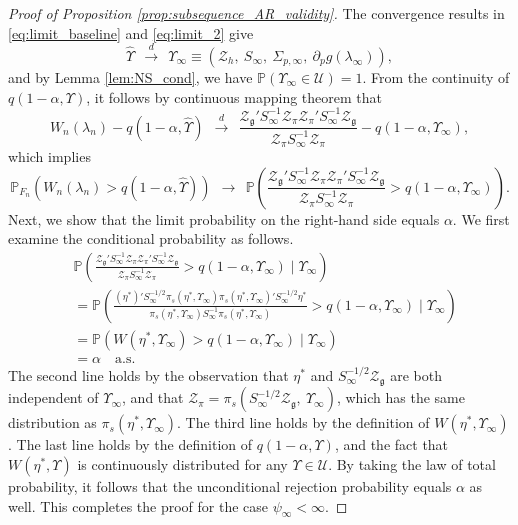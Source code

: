 \documentclass[11pt]{article}
\theoremstyle{definition}
\newcommand{\Prob}{\ensuremath{\mathbb{P}}} %
\newcommand{\0}{\ensuremath{\mathbf{0}}}
\begin{document}
\begin{bibunit}
\begin{proof}[Proof of Proposition \ref{prop:subsequence_AR_validity}]
The convergence results in \eqref{eq:limit_baseline} and \eqref{eq:limit_2} give  
\[
    \hat{\Upsilon} ~~\xrightarrow{d}~~ \Upsilon_\infty \equiv (\mathcal{Z}_h, ~S_\infty, ~\Sigma_{p,\infty}, ~\partial_p g(\lambda_\infty)),
\]
and by Lemma \ref{lem:NS_cond}, we have $\Prob(\Upsilon_\infty \in \mathcal{U}) = 1$. From the continuity of $q(1-\alpha,\Upsilon)$, it follows by continuous mapping theorem that
\[
    W_n(\lambda_n) - q(1-\alpha, \hat{\Upsilon}) ~~\xrightarrow{d}~~ \frac{\mathcal{Z}_{\mathfrak{g}}' S_\infty^{-1} \mathcal{Z}_\pi \mathcal{Z}_\pi' S_\infty^{-1} \mathcal{Z}_{\mathfrak{g}}}{\mathcal{Z}_\pi S_\infty^{-1} \mathcal{Z}_\pi} - q(1-\alpha, \Upsilon_\infty),
\]
which implies
\[
    \Prob_{F_n}\left(W_n(\lambda_n) > q(1-\alpha, \hat{\Upsilon})\right) ~~\to~~ \Prob\left(\frac{\mathcal{Z}_{\mathfrak{g}}' S_\infty^{-1} \mathcal{Z}_\pi \mathcal{Z}_\pi' S_\infty^{-1} \mathcal{Z}_{\mathfrak{g}}}{\mathcal{Z}_\pi S_\infty^{-1} \mathcal{Z}_\pi} > q(1-\alpha, \Upsilon_\infty)\right).
\]
Next, we show that the limit probability on the right-hand side equals $\alpha$. We first examine the conditional probability as follows.
\begin{align*}
    &\Prob\left(\frac{\mathcal{Z}_{\mathfrak{g}}' S_\infty^{-1} \mathcal{Z}_\pi \mathcal{Z}_\pi' S_\infty^{-1} \mathcal{Z}_{\mathfrak{g}}}{\mathcal{Z}_\pi S_\infty^{-1} \mathcal{Z}_\pi} > q(1-\alpha, \Upsilon_\infty) \mid \Upsilon_\infty\right) \\
    &= \Prob\left(\frac{(\eta^*)' S_\infty^{-1/2} \pi_s(\eta^*,\Upsilon_\infty) \pi_s(\eta^*,\Upsilon_\infty)' S_\infty^{-1/2} \eta^*}{\pi_s(\eta^*,\Upsilon_\infty) S_\infty^{-1} \pi_s(\eta^*,\Upsilon_\infty)} > q(1-\alpha, \Upsilon_\infty) \mid \Upsilon_\infty\right) \\
    &= \Prob\left(W(\eta^*,\Upsilon_\infty) > q(1-\alpha, \Upsilon_\infty) \mid \Upsilon_\infty\right) \\
    &= \alpha\quad \text{a.s.}
\end{align*}
The second line holds by the observation that $\eta^*$ and $S_\infty^{-1/2}\mathcal{Z}_{\mathfrak{g}}$ are both independent of $\Upsilon_\infty$, and that $\mathcal{Z}_\pi = \pi_s(S_\infty^{-1/2}\mathcal{Z}_{\mathfrak{g}},~\Upsilon_\infty)$, which has the same distribution as $\pi_s(\eta^*, \Upsilon_\infty)$. The third line holds by the definition of $W(\eta^*,\Upsilon_\infty)$. The last line holds by the definition of $q(1-\alpha,\Upsilon)$, and the fact that $W(\eta^*,\Upsilon)$ is continuously distributed for any $\Upsilon \in \mathcal{U}$. By taking the law of total probability, it follows that the unconditional rejection probability equals $\alpha$ as well. This completes the proof for the case $\psi_\infty < \infty$.


\end{proof}
\end{bibunit}
\end{document}
